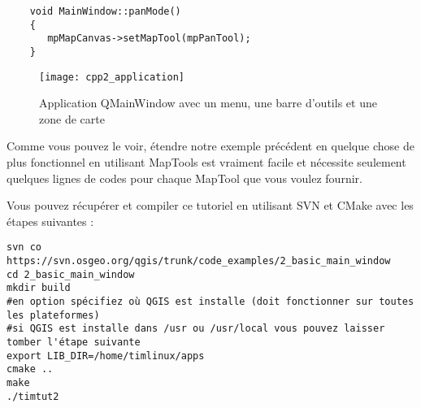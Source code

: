 \begin{verbatim}
    void MainWindow::panMode()
    {
       mpMapCanvas->setMapTool(mpPanTool); 
    }
\end{verbatim}

\begin{figure}[ht]
   \begin{center}
   \caption{Application QMainWindow avec un menu, une barre d'outils et une zone de carte
\osxcaption}\label{fig:cpp2_application}\smallskip
   \texttt{[image: cpp2\_application]}
\end{center}
\end{figure}


Comme vous pouvez le voir, étendre notre exemple précédent en quelque chose de 
plus fonctionnel en utilisant MapTools est vraiment facile et nécessite 
seulement quelques lignes de codes pour chaque MapTool que vous voulez fournir.

Vous pouvez récupérer et compiler ce tutoriel en utilisant SVN et CMake avec 
les étapes suivantes :

\begin{verbatim}
svn co https://svn.osgeo.org/qgis/trunk/code_examples/2_basic_main_window
cd 2_basic_main_window
mkdir build
#en option spécifiez où QGIS est installe (doit fonctionner sur toutes les plateformes)
#si QGIS est installe dans /usr ou /usr/local vous pouvez laisser tomber l'étape suivante
export LIB_DIR=/home/timlinux/apps
cmake ..
make
./timtut2
\end{verbatim}
